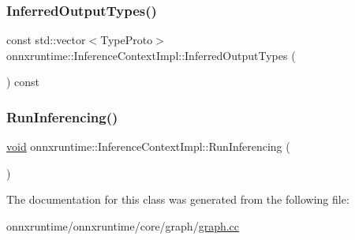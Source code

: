 \subsubsection{\texorpdfstring{Inferred\+Output\+Types()}{InferredOutputTypes()}}
{\footnotesize\ttfamily const std\+::vector$<$Type\+Proto$>$ onnxruntime\+::\+Inference\+Context\+Impl\+::\+Inferred\+Output\+Types (\begin{DoxyParamCaption}{ }\end{DoxyParamCaption}) const\hspace{0.3cm}{\ttfamily [inline]}}

\mbox{\label{classonnxruntime_1_1InferenceContextImpl_a03867e44217366769507abf47d0a237d}} 
\subsubsection{\texorpdfstring{Run\+Inferencing()}{RunInferencing()}}
{\footnotesize\ttfamily \mbox{\hyperlink{mlasi_8h_a88f941d423cb2a819b70a1358982b1a6}{void}} onnxruntime\+::\+Inference\+Context\+Impl\+::\+Run\+Inferencing (\begin{DoxyParamCaption}{ }\end{DoxyParamCaption})\hspace{0.3cm}{\ttfamily [inline]}}



The documentation for this class was generated from the following file\+:\begin{DoxyCompactItemize}
\item 
onnxruntime/onnxruntime/core/graph/\mbox{\hyperlink{graph_8cc}{graph.\+cc}}\end{DoxyCompactItemize}
